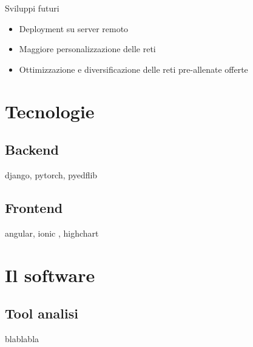 \documentclass[xcolor=x11names,compress, 
]{beamer}
\theoremstyle{definition} \newtheorem{esempio}{Esempio}
\theoremstyle{definition}
\begin{document}
		\begin{frame}{Sviluppi futuri}
			\begin{itemize}
				\item Deployment su server remoto\pause
				\item Maggiore personalizzazione delle reti \pause
				\item Ottimizzazione e diversificazione delle reti pre-allenate offerte
			\end{itemize}
		\end{frame}
	
\section{Tecnologie}
	\subsection{Backend}
		\begin{frame}{\subsecname}
			django, pytorch, pyedflib
		\end{frame}
	
	\subsection{Frontend}
		\begin{frame}{\subsecname}
			angular, ionic , highchart
		\end{frame}
	

\section{Il software}
	\subsection{Tool analisi}
		\begin{frame}{\subsecname}
			blablabla
		\end{frame}
	
\end{document}
